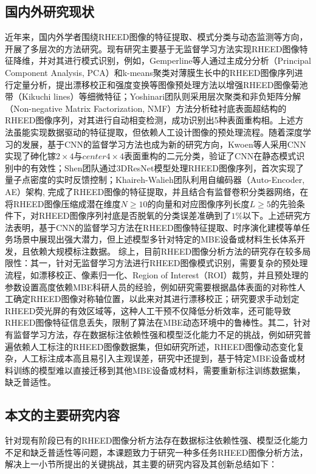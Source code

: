\subsection{国内外研究现状}
近年来，国内外学者围绕RHEED图像的特征提取、模式分类与动态监测等方向，开展了多层次的方法研究。现有研究主要基于无监督学习方法实现RHEED图像特征降维，并对其进行模式识别，例如，Gemperline等人通过主成分分析（Principal Component Analysis, PCA）和k-means聚类对薄膜生长中的RHEED图像序列进行定量分析，提出漂移校正和强度变换等图像预处理方法以增强RHEED图像菊池带（Kikuchi lines）等细微特征；Yoshinari团队则采用层次聚类和非负矩阵分解（Non-negative Matrix Factorization, NMF）方法分析硅衬底表面超结构的RHEED图像序列，对其进行自动相变检测，成功识别出5种表面重构相。上述方法虽能实现数据驱动的特征提取，但依赖人工设计图像的预处理流程。随着深度学习的发展，基于CNN的监督学习方法也成为新的研究方向，Kwoen等人采用CNN实现了砷化镓$2×4$与$center4×4$表面重构的二元分类，验证了CNN在静态模式识别中的有效性；Shen团队通过3DResNet模型处理RHEED图像序列，首次实现了量子点密度的实时反馈控制；Khaireh-Walieh团队利用自编码器（Auto-Encoder, AE）架构, 完成了RHEED图像的特征提取，并且结合有监督卷积分类器网络，在将RHEED图像压缩成潜在维度$N≥10$的向量和对应图像序列长度$L≥5$的先验条件下，对RHEED图像序列衬底是否脱氧的分类误差准确到了$1\%$以下。上述研究方法表明，基于CNN的监督学习方法在RHEED图像特征提取、时序演化建模等单任务场景中展现出强大潜力，但上述模型多针对特定的MBE设备或材料生长体系开发，且依赖大规模标注数据。
综上，目前RHEED图像分析方法的研究存在较多局限性：其一，针对无监督学习方法进行RHEED图像模式识别，需要复杂的预处理流程，如漂移校正、像素归一化、Region of Interest（ROI）裁剪，并且预处理的参数设置高度依赖MBE科研人员的经验，例如研究需要根据晶体表面的对称性人工确定RHEED图像对称轴位置，以此来对其进行漂移校正；研究要求手动划定RHEED荧光屏的有效区域等，这种人工干预不仅降低分析效率，还可能导致RHEED图像特征信息丢失，限制了算法在MBE动态环境中的鲁棒性。其二，针对有监督学习方法，存在数据标注依赖性强和模型泛化能力不足的挑战，例如研究普遍依赖人工标注的RHEED图像数据集，但如研究所述，RHEED图像动态变化复杂，人工标注成本高且易引入主观误差，研究中还提到，基于特定MBE设备或材料训练的模型难以直接迁移到其他MBE设备或材料，需要重新标注训练数据集，缺乏普适性。

\subsection{本文的主要研究内容}
针对现有阶段已有的RHEED图像分析方法存在数据标注依赖性强、模型泛化能力不足和缺乏普适性等问题，本课题致力于研究一种多任务RHEED图像分析方法，解决上一小节所提出的关键挑战，其主要的研究内容及其创新总结如下：

